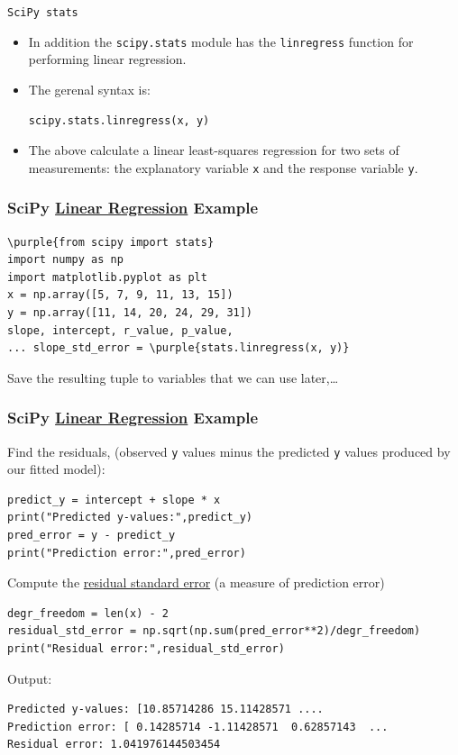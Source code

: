 \documentclass[xcolor=svgnames, handout]{beamer}
\newcommand{\purple}[1]{{\textcolor{purple}{#1}}}
\newcommand{\nl}{\\[1em]}
\newcommand{\ft}[1]{\frametitle{#1}}
\begin{document}
\begin{frame}[fragile]{\tt SciPy stats}
\begin{itemize}
\item In addition the {\tt scipy.stats} module has the {\tt linregress} function for performing linear regression.\nl
\item The gerenal syntax is:\
\begin{Verbatim}[frame=single]
scipy.stats.linregress(x, y)
\end{Verbatim}
\item The above calculate a linear least-squares regression for two sets of measurements:  the explanatory variable {\tt x} and the response variable {\tt y}.
\end{itemize}
\end{frame}

\begin{frame}[fragile]\ft{SciPy \href{https://docs.scipy.org/doc/scipy/reference/generated/scipy.stats.linregress.html}{Linear Regression} Example}
\begin{Verbatim}[xleftmargin=-.1in, fontsize=\small, commandchars=\\\{\}, frame=single] 
\purple{from scipy import stats}
import numpy as np
import matplotlib.pyplot as plt
x = np.array([5, 7, 9, 11, 13, 15])
y = np.array([11, 14, 20, 24, 29, 31])
slope, intercept, r_value, p_value, 
... slope_std_error = \purple{stats.linregress(x, y)}
\end{Verbatim}
Save the resulting tuple to variables that we can use later,\dots
\end{frame}



\begin{frame}[fragile]\ft{SciPy \href{https://docs.scipy.org/doc/scipy/reference/generated/scipy.stats.linregress.html}{Linear Regression} Example}
Find the residuals, (observed {\tt y} values minus the predicted {\tt y} values produced by our fitted model):
\begin{Verbatim}[xleftmargin=-.1in, fontsize=\small, commandchars=\\\{\}, frame=single] 
predict_y = intercept + slope * x
print("Predicted y-values:",predict_y)
pred_error = y - predict_y
print("Prediction error:",pred_error)
\end{Verbatim}
Compute the \href{https://www.investopedia.com/terms/r/residual-standard-deviation.asp}{residual standard error} (a measure of prediction error)
\begin{Verbatim}[xleftmargin=-.1in, fontsize=\small, commandchars=\\\{\}, frame=single] 
degr_freedom = len(x) - 2
residual_std_error = np.sqrt(np.sum(pred_error**2)/degr_freedom)
print("Residual error:",residual_std_error)
\end{Verbatim}
Output:
\begin{Verbatim}[frame=single]
Predicted y-values: [10.85714286 15.11428571 ....
Prediction error: [ 0.14285714 -1.11428571  0.62857143  ...
Residual error: 1.041976144503454
\end{Verbatim}
\end{frame}
\end{document}
